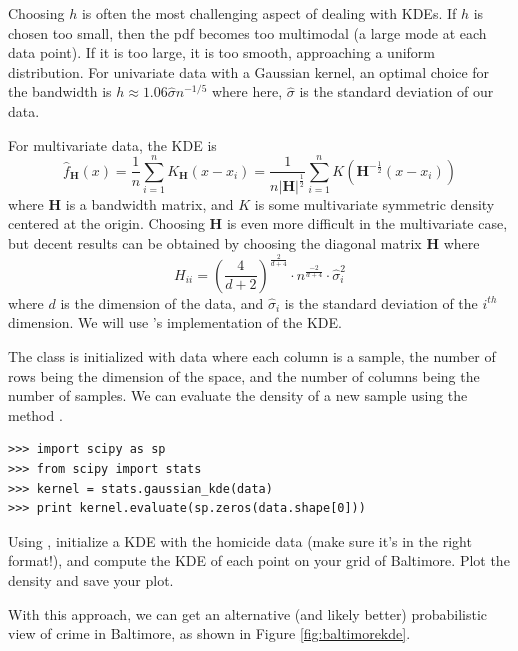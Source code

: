 Choosing $h$ is often the most challenging aspect of dealing with KDEs. If $h$ is chosen too small, then the pdf becomes too multimodal (a large mode at each data point). If it is too large, it is too smooth, approaching a uniform distribution. For univariate data with a Gaussian kernel, an optimal choice for the bandwidth is $h \approx 1.06\widehat{\sigma}n^{-1/5}$ where here, $\widehat{\sigma}$ is the standard deviation of our data.

For multivariate data, the KDE is 
\begin{equation*}
\widehat{f}_{\mathbf{H}}(x) = \frac{1}{n} \sum_{i=1}^{n} K_{\mathbf{H}}(x - x_{i}) = \frac{1}{n\lvert \mathbf{H} \rvert^{\frac{1}{2}}} \sum_{i=1}^{n} K(\mathbf{H}^{-\frac{1}{2}}(x - x_{i}))
\end{equation*}
where $\mathbf{H}$ is a bandwidth matrix, and $K$ is some multivariate symmetric density centered at the origin. Choosing $\mathbf{H}$ is even more difficult in the multivariate case, but decent results can be obtained by choosing the diagonal matrix $\mathbf{H}$ where 
\begin{equation*}
H_{ii} = (\frac{4}{d+2})^{\frac{2}{d+4}} \cdot n^{\frac{-2}{d+4}} \cdot \widehat{\sigma}_{i}^{2}
\end{equation*}
where $d$ is the dimension of the data, and $\widehat{\sigma}_{i}$ is the standard deviation of the $i^{th}$ dimension. We will use 's implementation of the KDE.

The  class is initialized with data where each column is a sample, the number of rows being the dimension of the space, and the number of columns being the number of samples. We can evaluate the density of a new sample using the method .
\begin{lstlisting}
>>> import scipy as sp
>>> from scipy import stats
>>> kernel = stats.gaussian_kde(data)
>>> print kernel.evaluate(sp.zeros(data.shape[0]))
\end{lstlisting}

\begin{problem}
Using , initialize a KDE with the homicide data (make sure it's in the right format!), and compute the KDE of each point on your grid of Baltimore. Plot the density and save your plot.
\end{problem}

With this approach, we can get an alternative (and likely better) probabilistic view of crime in Baltimore, as shown in Figure \ref{fig:baltimorekde}.

